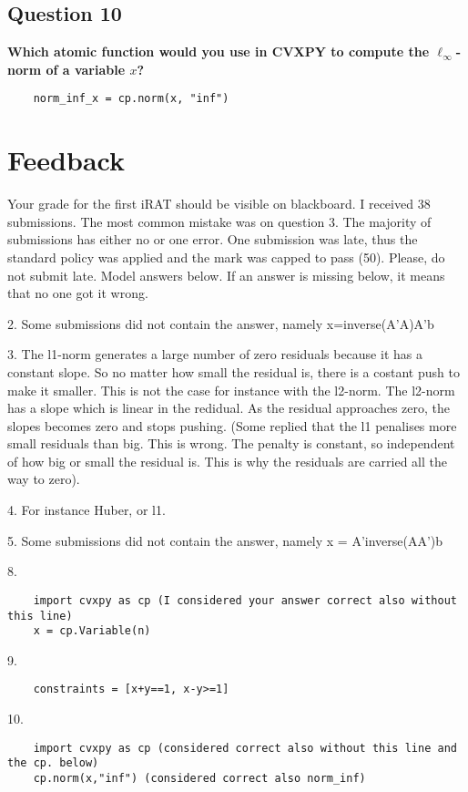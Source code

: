 \subsection*{Question 10}
\textbf{Which atomic function would you use in CVXPY to compute the $\ell_\infty$-norm of a variable $x$?}

\begin{lstlisting}
    norm_inf_x = cp.norm(x, "inf")
\end{lstlisting}

\section*{Feedback}

Your grade for the first iRAT should be visible on blackboard. I received 38 submissions. The most common mistake was on question 3. The majority of submissions has either no or one error. One submission was late, thus the standard policy was applied and the mark was capped to pass (50). Please, do not submit late. Model answers below. If an answer is missing below, it means that no one got it wrong.

2. Some submissions did not contain the answer, namely x=inverse(A'A)A'b

3. The l1-norm generates a large number of zero residuals because it has a constant slope. So no matter how small the residual is, there is a costant push to make it smaller. This is not the case for instance with the l2-norm. The l2-norm has a slope which is linear in the redidual. As the residual approaches zero, the slopes becomes zero and stops pushing. (Some replied that the l1 penalises more small residuals than big. This is wrong. The penalty is constant, so independent of how big or small the residual is. This is why the residuals are carried all the way to zero).

4. For instance Huber, or l1.

5. Some submissions did not contain the answer, namely x = A'inverse(AA')b

8. 

\begin{lstlisting}
    import cvxpy as cp (I considered your answer correct also without this line)
    x = cp.Variable(n)
\end{lstlisting}

9. 

\begin{lstlisting}
    constraints = [x+y==1, x-y>=1]
\end{lstlisting}

10. 

\begin{lstlisting}
    import cvxpy as cp (considered correct also without this line and the cp. below)
    cp.norm(x,"inf") (considered correct also norm_inf)
\end{lstlisting}
